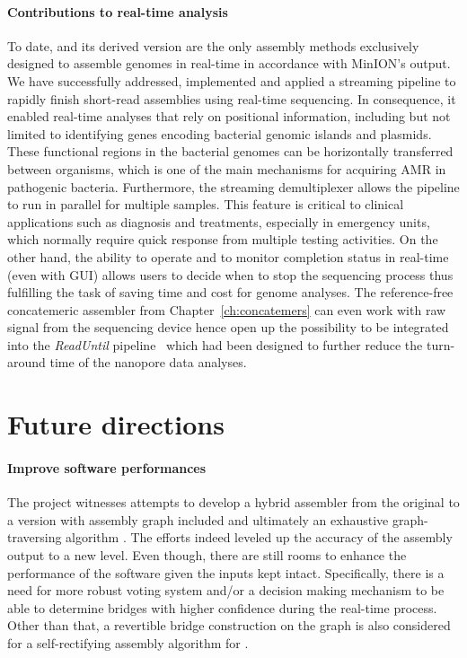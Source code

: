 \paragraph{Contributions to real-time analysis}
To date, \npscarf{} and its derived version \npgraph{} are the only assembly methods exclusively designed to assemble genomes in real-time in accordance with MinION's output.
We have successfully addressed, implemented and applied a streaming pipeline to rapidly finish short-read assemblies using real-time sequencing.
In consequence, it enabled real-time analyses that rely on positional information, including but not limited to identifying genes encoding bacterial genomic islands and plasmids.
These functional regions in the bacterial genomes can be horizontally  transferred  between  organisms,  which  is  one  of  the  main  mechanisms for acquiring AMR in pathogenic bacteria.  
Furthermore, the streaming demultiplexer \npbarcode{} allows the pipeline to run in parallel for multiple samples.
This feature is critical to clinical applications such as diagnosis and treatments, especially in emergency units, which normally require quick response from multiple testing activities.
On the other hand, the ability to operate and to monitor completion status in real-time (even with GUI) allows users to decide when to stop the sequencing process thus fulfilling the task of saving time and cost for genome analyses.
The reference-free concatemeric assembler from Chapter~\ref{ch:concatemers} can even work with raw signal from the sequencing device hence open up the possibility to be integrated into the \emph{ReadUntil} pipeline~\cite{LooseMS2016} which had been designed to further reduce the turn-around time of the nanopore data analyses.
\section{Future directions}
\paragraph{Improve software performances}
The project witnesses attempts to develop a hybrid assembler from the original \npscarf{} to a version with assembly graph included and ultimately an exhaustive graph-traversing algorithm \npgraph{}. 
The efforts indeed leveled up the accuracy of the assembly output to a new level.
Even though, there are still rooms to enhance the performance of the software given the inputs kept intact.
Specifically, there is a need for more robust voting system and/or a decision making mechanism to be able to determine bridges with higher confidence during the real-time process.  
Other than that, a revertible bridge construction on the graph is also considered for a self-rectifying assembly algorithm for \npgraph{}. 

